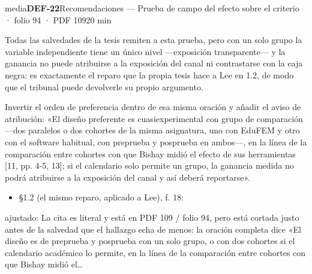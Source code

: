 \begin{ficha}{media}{\casilla\textbf{DEF-22}\quad{}\quad Recomendaciones — Prueba de campo del efecto sobre el criterio · folio 94 · PDF 109\hfill 20 min}
\par
{}Todas las salvedades de la tesis remiten a esta prueba, pero con un solo grupo la variable independiente tiene un único nivel —exposición transparente— y la ganancia no puede atribuirse a la exposición del canal ni contrastarse con la caja negra: es exactamente el reparo que la propia tesis hace a Lee en 1.2, de modo que el tribunal puede devolverle su propio argumento.\par
{}Invertir el orden de preferencia dentro de esa misma oración y añadir el aviso de atribución: «El diseño preferente es cuasiexperimental con grupo de comparación —dos paralelos o dos cohortes de la misma asignatura, uno con EduFEM y otro con el software habitual, con preprueba y posprueba en ambos—, en la línea de la comparación entre cohortes con que Bishay midió el efecto de sus herramientas [11, pp. 4-5, 13]\allowbreak{}; si el calendario solo permite un grupo, la ganancia medida no podrá atribuirse a la exposición del canal y así deberá reportarse».\par
{}\begin{itemize}[leftmargin=1.2em,itemsep=1pt,topsep=1pt]
\item {\small §1.2 (el mismo reparo, aplicado a Lee), f. 18: }
\end{itemize}
{\footnotesize\color{gris}ajustado: La cita es literal y está en PDF 109 /\allowbreak{} folio 94, pero está cortada justo antes de la salvedad que el hallazgo echa de menos: la oración completa dice «El diseño es de preprueba y posprueba con un solo grupo, o con dos cohortes si el calendario académico lo permite, en la línea de la comparación entre cohortes con que Bishay midió el…\par}
\end{ficha}
